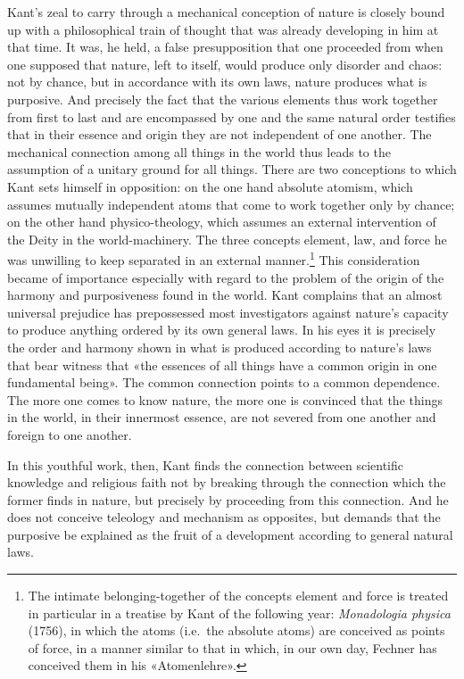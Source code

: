 \documentclass[12pt,a4paper]{article}
\newcommand{\opage}[1]{\marginnote{\footnotesize\textit{[#1]}}}
\begin{document}
Kant's zeal to carry through a mechanical conception of nature is closely
bound up \opage{10}with a philosophical train of thought that was already developing
in him at that time. It was, he held, a false presupposition that one
proceeded from when one supposed that nature, left to itself, would
produce only disorder and chaos: not by chance, but in accordance with its
own laws, nature produces what is purposive. And precisely the fact that
the various elements thus work together from first to last and are
encompassed by one and the same natural order testifies that in their
essence and origin they are not independent of one another. The mechanical
connection among all things in the world thus leads to the assumption of a
unitary ground for all things. There are two conceptions to which Kant
sets himself in opposition: on the one hand absolute atomism, which
assumes mutually independent atoms that come to work together only by
chance; on the other hand physico-theology, which assumes an external
intervention of the Deity in the world-machinery. The three concepts
element, law, and force he was unwilling to keep separated in an external
manner.\footnote{The intimate belonging-together of the concepts element
and force is treated in particular in a treatise by Kant of the following
year: \textit{Monadologia physica} (1756), in which the atoms (i.e.\ the
absolute atoms) are conceived as points of force, in a manner similar to
that in which, in our own day, Fechner has conceived them in his
«Atomenlehre».} This consideration became of importance especially with
regard to the problem of the origin of the harmony and purposiveness found
in the world. Kant complains that an almost universal prejudice has
prepossessed most investigators against nature's capacity to produce
anything ordered by its own general laws. In his eyes it is precisely the
order and harmony shown in what is produced according to nature's laws
that bear witness that «the essences of all things have a common origin in
one fundamental being». The common connection points to a common
dependence. The more one comes to know nature, the more one is convinced
that the things in the world, in their innermost essence, are not severed
from one another and foreign to one another.

In this youthful work, then, Kant finds the connection between scientific
knowledge and religious faith not by breaking through the connection which
the former finds in nature, but precisely by proceeding from this
connection. And he does not conceive teleology and mechanism as
opposites, but demands that the purposive be explained as the fruit of a
development according to general natural laws.
\end{document}
